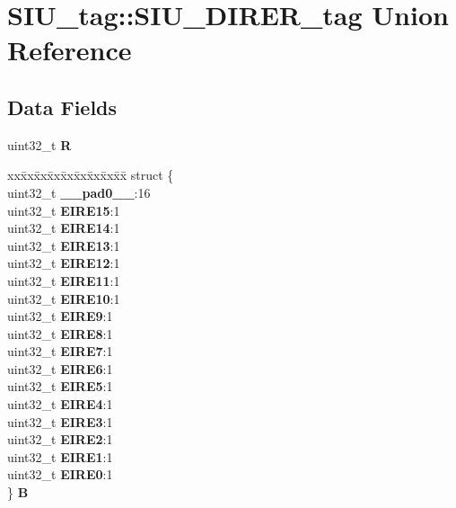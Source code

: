 \hypertarget{unionSIU__tag_1_1SIU__DIRER__tag}{}\section{S\+I\+U\+\_\+tag\+::S\+I\+U\+\_\+\+D\+I\+R\+E\+R\+\_\+tag Union Reference}
\label{unionSIU__tag_1_1SIU__DIRER__tag}
\subsection*{Data Fields}
\begin{DoxyCompactItemize}
\item 
\mbox{\label{unionSIU__tag_1_1SIU__DIRER__tag_a3d9a0c6ce684c78ed340d2180c82789b}} 
uint32\+\_\+t {\bfseries R}
\item 
\mbox{\label{unionSIU__tag_1_1SIU__DIRER__tag_a7665e007c5c1db914f1502cbad38f0cc}} 
\begin{tabbing}
xx\=xx\=xx\=xx\=xx\=xx\=xx\=xx\=xx\=\kill
struct \{\\
\>uint32\_t {\bfseries \_\_pad0\_\_}:16\\
\>uint32\_t {\bfseries EIRE15}:1\\
\>uint32\_t {\bfseries EIRE14}:1\\
\>uint32\_t {\bfseries EIRE13}:1\\
\>uint32\_t {\bfseries EIRE12}:1\\
\>uint32\_t {\bfseries EIRE11}:1\\
\>uint32\_t {\bfseries EIRE10}:1\\
\>uint32\_t {\bfseries EIRE9}:1\\
\>uint32\_t {\bfseries EIRE8}:1\\
\>uint32\_t {\bfseries EIRE7}:1\\
\>uint32\_t {\bfseries EIRE6}:1\\
\>uint32\_t {\bfseries EIRE5}:1\\
\>uint32\_t {\bfseries EIRE4}:1\\
\>uint32\_t {\bfseries EIRE3}:1\\
\>uint32\_t {\bfseries EIRE2}:1\\
\>uint32\_t {\bfseries EIRE1}:1\\
\>uint32\_t {\bfseries EIRE0}:1\\
\} {\bfseries B}\\


\end{tabbing}
\end{DoxyCompactItemize}
